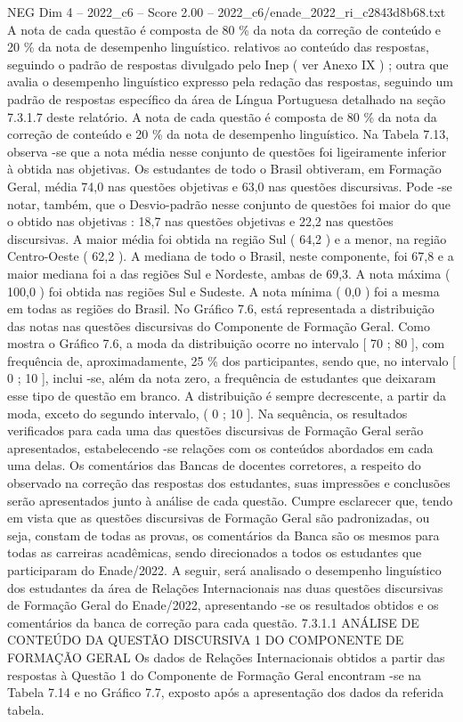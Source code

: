 \begin{textsample}{NEG Dim 4 – 2022\_c6 – Score 2.00 – 2022\_c6/enade\_2022\_ri\_c2843d8b68.txt}
A nota de cada questão é composta de 80 \% da nota da correção de conteúdo e 20 \% da nota de desempenho linguístico. relativos ao conteúdo das respostas, seguindo o padrão de respostas divulgado pelo Inep ( ver Anexo IX ) ; outra que avalia o desempenho linguístico expresso pela redação das respostas, seguindo um padrão de respostas específico da área de Língua Portuguesa detalhado na seção 7.3.1.7 deste relatório.
A nota de cada questão é composta de 80 \% da nota da correção de conteúdo e 20 \% da nota de desempenho linguístico.
Na Tabela 7.13, observa -se que a nota média nesse conjunto de questões foi ligeiramente inferior à obtida nas objetivas.
Os estudantes de todo o Brasil obtiveram, em Formação Geral, média 74,0 nas questões objetivas e 63,0 nas questões discursivas.
Pode -se notar, também, que o Desvio-padrão nesse conjunto de questões foi maior do que o obtido nas objetivas : 18,7 nas questões objetivas e 22,2 nas questões discursivas.
A maior média foi obtida na região Sul ( 64,2 ) e a menor, na região Centro-Oeste ( 62,2 ).
A mediana de todo o Brasil, neste componente, foi 67,8 e a maior mediana foi a das regiões Sul e Nordeste, ambas de 69,3.
A nota máxima ( 100,0 ) foi obtida nas regiões Sul e Sudeste.
A nota mínima ( 0,0 ) foi a mesma em todas as regiões do Brasil.
No Gráfico 7.6, está representada a distribuição das notas nas questões discursivas do Componente de Formação Geral.
Como mostra o Gráfico 7.6, a moda da distribuição ocorre no intervalo [ 70 ; 80 ], com frequência de, aproximadamente, 25 \% dos participantes, sendo que, no intervalo [ 0 ; 10 ], inclui -se, além da nota zero, a frequência de estudantes que deixaram esse tipo de questão em branco.
A distribuição é sempre decrescente, a partir da moda, exceto do segundo intervalo, ( 0 ; 10 ].
Na sequência, os resultados verificados para cada uma das questões discursivas de Formação Geral serão apresentados, estabelecendo -se relações com os conteúdos abordados em cada uma delas.
Os comentários das Bancas de docentes corretores, a respeito do observado na correção das respostas dos estudantes, suas impressões e conclusões serão apresentados junto à análise de cada questão.
Cumpre esclarecer que, tendo em vista que as questões discursivas de Formação Geral são padronizadas, ou seja, constam de todas as provas, os comentários da Banca são os mesmos para todas as carreiras acadêmicas, sendo direcionados a todos os estudantes que participaram do Enade/2022.
A seguir, será analisado o desempenho linguístico dos estudantes da área de Relações Internacionais nas duas questões discursivas de Formação Geral do Enade/2022, apresentando -se os resultados obtidos e os comentários da banca de correção para cada questão. 7.3.1.1 ANÁLISE DE CONTEÚDO DA QUESTÃO DISCURSIVA 1 DO COMPONENTE DE FORMAÇÃO GERAL Os dados de Relações Internacionais obtidos a partir das respostas à Questão 1 do Componente de Formação Geral encontram -se na Tabela 7.14 e no Gráfico 7.7, exposto após a apresentação dos dados da referida tabela.

\end{textsample}
